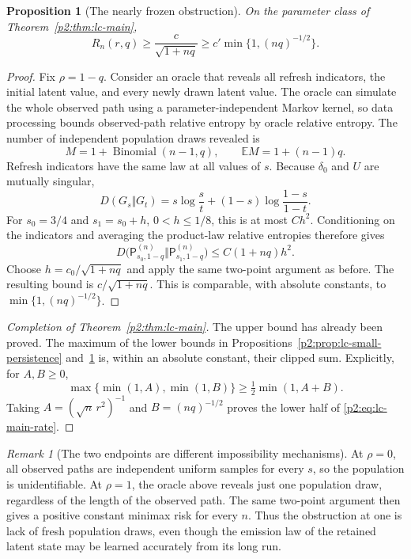 \documentclass[11pt,a4paper]{article}
\newtheorem{proposition}[theorem]{Proposition}
\theoremstyle{definition}
\theoremstyle{remark}
\newtheorem{remark}[theorem]{Remark}
\numberwithin{equation}{section}
\begin{document}
\begin{proposition}[The nearly frozen obstruction]
\label{p2:prop:lc-frozen}
On the parameter class of Theorem~\ref{p2:thm:lc-main},
\begin{equation}\label{p2:eq:lc-frozen-lower}
 R_n(r,q)\ge\frac c{\sqrt{1+nq}}
             \ge c'\min\{1,(nq)^{-1/2}\}.
\end{equation}
\end{proposition}
\begin{proof}
Fix $\rho=1-q$.  Consider an oracle that reveals all refresh indicators,
the initial latent value, and every newly drawn latent value.  The oracle
can simulate the whole observed path using a parameter-independent Markov
kernel, so data processing bounds observed-path relative entropy by oracle
relative entropy.  The number of independent population draws revealed is
\[
 M=1+\operatorname{Binomial}(n-1,q),
 \qquad \mathbb E M=1+(n-1)q.
\]
Refresh indicators have the same law at all values of $s$.  Because $\delta_0$
and $U$ are mutually singular,
\[
 D(G_s\Vert G_t)
   =s\log\frac{s}{t}+(1-s)\log\frac{1-s}{1-t}.
\]
For $s_0=3/4$ and $s_1=s_0+h$, $0<h\le1/8$, this is at most $Ch^2$.
Conditioning on the indicators and averaging the product-law relative
entropies therefore gives
\[
 D\bigl(\mathsf P^{(n)}_{s_0,1-q}
             \Vert\mathsf P^{(n)}_{s_1,1-q}\bigr)
       \le C(1+nq)h^2.
\]
Choose $h=c_0/\sqrt{1+nq}$ and apply the same two-point argument as before.
The resulting bound is $c/\sqrt{1+nq}$.  This is comparable, with absolute
constants, to $\min\{1,(nq)^{-1/2}\}$.
\end{proof}

\begin{proof}[Completion of Theorem~\ref{p2:thm:lc-main}]
The upper bound has already been proved.  The maximum of the lower bounds
in Propositions~\ref{p2:prop:lc-small-persistence} and~\ref{p2:prop:lc-frozen}
is, within an absolute constant, their clipped sum.  Explicitly, for
$A,B\ge0$,
\[
 \max\{\min(1,A),\min(1,B)\}
       \ge\tfrac12\min(1,A+B).
\]
Taking $A=(\sqrt n\,r^2)^{-1}$ and $B=(nq)^{-1/2}$ proves the lower
half of \eqref{p2:eq:lc-main-rate}.
\end{proof}

\begin{remark}[The two endpoints are different impossibility mechanisms]
At $\rho=0$, all observed paths are independent uniform samples for every
$s$, so the population is unidentifiable.  At $\rho=1$, the oracle above
reveals just one population draw, regardless of the length of the observed
path.  The same two-point argument then gives a positive constant minimax
risk for every $n$.  Thus the obstruction at one is lack of fresh population
draws, even though the emission law of the retained latent state may be
learned accurately from its long run.
\end{remark}
\end{document}
